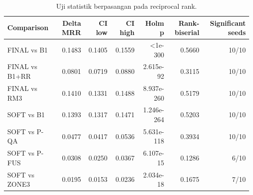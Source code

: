 \begin{table}[t]
\centering
\small
\caption{Uji statistik berpasangan pada reciprocal rank.}
\label{tab:statistics}
\begin{tabular}{lrrrrrr}
\toprule
Comparison & Delta MRR & CI low & CI high & Holm p & Rank-biserial & Significant seeds \\
\midrule
FINAL vs B1 & 0.1483 & 0.1405 & 0.1559 & <1e-300 & 0.5660 & 10/10 \\
FINAL vs B1+RR & 0.0801 & 0.0719 & 0.0880 & 2.615e-92 & 0.3115 & 10/10 \\
FINAL vs RM3 & 0.1410 & 0.1331 & 0.1488 & 8.937e-260 & 0.5179 & 10/10 \\
SOFT vs B1 & 0.1393 & 0.1317 & 0.1471 & 1.246e-264 & 0.5203 & 10/10 \\
SOFT vs P-QA & 0.0477 & 0.0417 & 0.0536 & 5.631e-118 & 0.3934 & 10/10 \\
SOFT vs P-FUS & 0.0308 & 0.0250 & 0.0367 & 6.107e-15 & 0.1286 & 6/10 \\
SOFT vs ZONE3 & 0.0195 & 0.0153 & 0.0236 & 2.034e-18 & 0.1675 & 7/10 \\
\bottomrule
\end{tabular}
\end{table}
